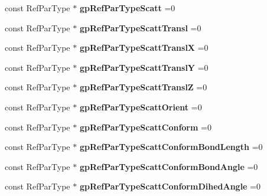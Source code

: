 \begin{DoxyCompactItemize}
\mbox{\label{namespace_obj_cryst_aa4611ac233721170c239e620689eba73}} 
const Ref\+Par\+Type $\ast$ {\bfseries gp\+Ref\+Par\+Type\+Scatt} =0
\item 
\mbox{\label{namespace_obj_cryst_ad432dd108d2e627981a52ce91f87f06d}} 
const Ref\+Par\+Type $\ast$ {\bfseries gp\+Ref\+Par\+Type\+Scatt\+Transl} =0
\item 
\mbox{\label{namespace_obj_cryst_adaf365a408b8ffbdcbbbe2fee8d4a3d0}} 
const Ref\+Par\+Type $\ast$ {\bfseries gp\+Ref\+Par\+Type\+Scatt\+TranslX} =0
\item 
\mbox{\label{namespace_obj_cryst_a923f7dbb1f31ad73b7137c6a89728bf6}} 
const Ref\+Par\+Type $\ast$ {\bfseries gp\+Ref\+Par\+Type\+Scatt\+TranslY} =0
\item 
\mbox{\label{namespace_obj_cryst_a820971fe634aaa6c607b244fc3f29702}} 
const Ref\+Par\+Type $\ast$ {\bfseries gp\+Ref\+Par\+Type\+Scatt\+TranslZ} =0
\item 
\mbox{\label{namespace_obj_cryst_a9f6a9f432b6d5d785d67b1dc42b49745}} 
const Ref\+Par\+Type $\ast$ {\bfseries gp\+Ref\+Par\+Type\+Scatt\+Orient} =0
\item 
\mbox{\label{namespace_obj_cryst_a9a152b368248e57f2dcec0f1bc87416e}} 
const Ref\+Par\+Type $\ast$ {\bfseries gp\+Ref\+Par\+Type\+Scatt\+Conform} =0
\item 
\mbox{\label{namespace_obj_cryst_a9c71f56f7abc8e6a970c7df5ff4abd16}} 
const Ref\+Par\+Type $\ast$ {\bfseries gp\+Ref\+Par\+Type\+Scatt\+Conform\+Bond\+Length} =0
\item 
\mbox{\label{namespace_obj_cryst_a55335d98ca3eef8139fe34b60aaad28b}} 
const Ref\+Par\+Type $\ast$ {\bfseries gp\+Ref\+Par\+Type\+Scatt\+Conform\+Bond\+Angle} =0
\item 
\mbox{\label{namespace_obj_cryst_a320cae69add68e5c186276fb0143f65d}} 
const Ref\+Par\+Type $\ast$ {\bfseries gp\+Ref\+Par\+Type\+Scatt\+Conform\+Dihed\+Angle} =0

\end{DoxyCompactItemize}
